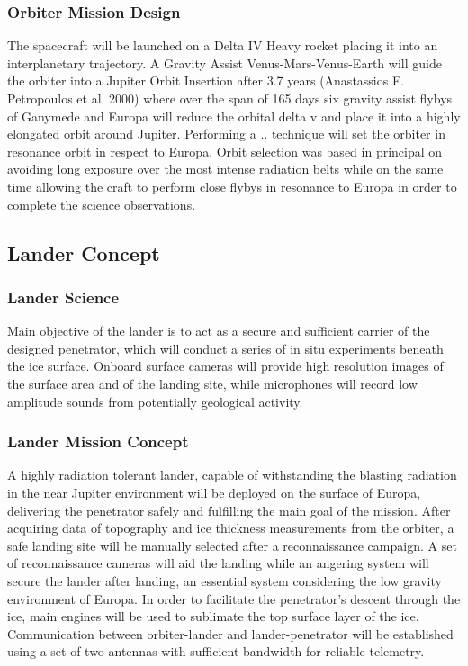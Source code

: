 \subsubsection{Orbiter Mission Design}
The spacecraft will be launched on a Delta IV Heavy rocket placing it into an interplanetary trajectory. A Gravity Assist Venus-Mars-Venus-Earth will guide the orbiter into a Jupiter Orbit Insertion after 3.7 years (Anastassios E. Petropoulos et al. 2000) where over the span of 165 days six gravity assist flybys of Ganymede and Europa will reduce the orbital delta v and place it into a highly elongated orbit around Jupiter. Performing a {{..}} technique will set the orbiter in resonance orbit in respect to Europa. Orbit selection was based in principal on avoiding long exposure over the most intense radiation belts while on the same time allowing the craft to perform close flybys in resonance to Europa in order to complete the science observations.

\subsection{Lander Concept}

\subsubsection{Lander Science}

Main objective of the lander is to act as a secure and sufficient carrier of the designed penetrator, which will conduct a series of in situ experiments beneath the ice surface. Onboard surface cameras will provide high resolution images of the surface area and of the landing site, while microphones will record low amplitude sounds from potentially geological activity.

\subsubsection{Lander Mission Concept}
A highly radiation tolerant lander, capable of withstanding the blasting radiation in the near Jupiter environment will be deployed on the surface of Europa, delivering the penetrator safely and fulfilling the main goal of the mission. 
After acquiring data of topography and ice thickness measurements from the orbiter, a safe landing site will be manually selected after a reconnaissance campaign. A set of reconnaissance cameras will aid the landing while an angering system will secure the lander after landing, an essential system considering the low gravity environment of Europa. In order to facilitate the penetrator’s descent through the ice, main engines will be used to sublimate the top surface layer of the ice. Communication between orbiter-lander and lander-penetrator will be established using a set of two antennas with sufficient bandwidth for reliable telemetry.


